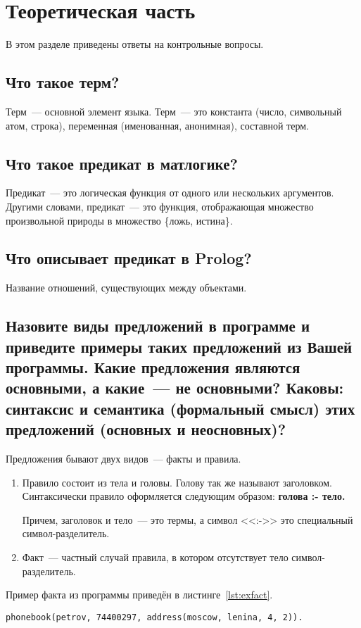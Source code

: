 \chapter{Теоретическая часть}

В этом разделе приведены ответы на контрольные вопросы.

\section{Что такое терм?}
Терм~--- основной элемент языка. Терм~--- это константа (число, символьный атом, строка), переменная (именованная, анонимная), составной терм.

\section{Что такое предикат в матлогике?}
Предикат~--- это логическая функция от одного или нескольких аргументов. Другими словами, предикат~--- это функция, отображающая множество произвольной природы в множество \{ложь, истина\}.

\section{Что описывает предикат в Prolog?}
Название отношений, существующих между объектами.

\section{Назовите виды предложений в программе и приведите примеры таких предложений из Вашей программы. Какие предложения являются основными, а какие~--- не основными? Каковы: синтаксис и семантика (формальный смысл) этих предложений (основных и неосновных)?}
Предложения бывают двух видов~--- факты и правила.
\begin{enumerate}
    \item Правило состоит из тела и головы. Голову так же называют заголовком. Синтаксически правило оформляется следующим образом: \textbf{голова :- тело.}

    Причем, заголовок и тело~--- это термы, а символ <<:->> это специальный символ-разделитель.
    \item Факт~--- частный случай правила, в котором отсутствует тело символ-разделитель.
\end{enumerate}

Пример факта из программы приведён в листинге~\ref{lst:exfact}.
\begin{lstlisting}[caption={Пример факта},label=lst:exfact]
phonebook(petrov, 74400297, address(moscow, lenina, 4, 2)).
\end{lstlisting}

